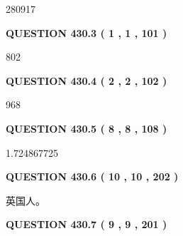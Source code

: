\documentclass{ctexart}
\begin{document}
  
 
 
\noindent{}

280917
 
 
  
\vspace{0.2in}
  
{\textbf{\Large{QUESTION
430.3 
 ( 1 , 1 , 101 )
}}}
  
  
 
 
\noindent{}

802
 
 
  
\vspace{0.2in}
  
{\textbf{\Large{QUESTION
430.4 
 ( 2 , 2 , 102 )
}}}
  
  
 
 
\noindent{}

968
 
 
  
\vspace{0.2in}
  
{\textbf{\Large{QUESTION
430.5 
 ( 8 , 8 , 108 )
}}}
  
  
 
 
\noindent{}

1.724867725
 
 
  
\vspace{0.2in}
  
{\textbf{\Large{QUESTION
430.6 
 ( 10 , 10 , 202 )
}}}
  
  
 
 
\noindent{}
 
 
英国人。
 
 
 
 
  
\vspace{0.2in}
  
{\textbf{\Large{QUESTION
430.7 
 ( 9 , 9 , 201 )
}}}
  
  
 
 
\noindent{}
 
\end{document}
